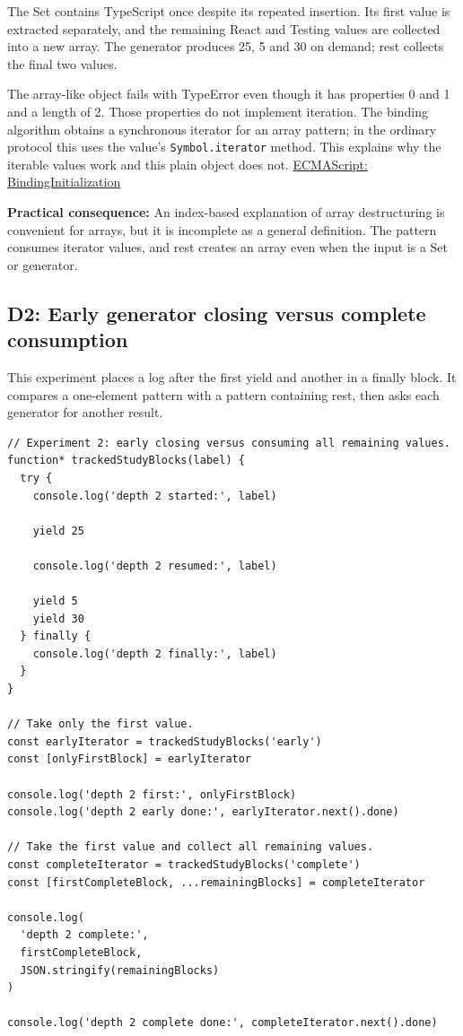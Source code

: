 \documentclass[10pt,a4paper]{article}
\begin{document}
The Set contains TypeScript once despite its repeated insertion. Its first value is extracted separately, and the remaining React and Testing values are collected into a new array. The generator produces 25, 5 and 30 on demand; rest collects the final two values.

The array-like object fails with TypeError even though it has properties 0 and 1 and a length of 2. Those properties do not implement iteration. The binding algorithm obtains a synchronous iterator for an array pattern; in the ordinary protocol this uses the value's \texttt{Symbol.\allowbreak{}iterator} method. This explains why the iterable values work and this plain object does not. \href{https://tc39.es/ecma262/multipage/syntax-directed-operations.html\#sec-runtime-semantics-bindinginitialization}{ECMAScript: BindingInitialization}

\textbf{Practical consequence:} An index-based explanation of array destructuring is convenient for arrays, but it is incomplete as a general definition. The pattern consumes iterator values, and rest creates an array even when the input is a Set or generator.

\subsection{D2: Early generator closing versus complete consumption}

This experiment places a log after the first yield and another in a finally block. It compares a one-element pattern with a pattern containing rest, then asks each generator for another result.

\begin{lstlisting}[language=GuideJS]
// Experiment 2: early closing versus consuming all remaining values.
function* trackedStudyBlocks(label) {
  try {
    console.log('depth 2 started:', label)

    yield 25

    console.log('depth 2 resumed:', label)

    yield 5
    yield 30
  } finally {
    console.log('depth 2 finally:', label)
  }
}

// Take only the first value.
const earlyIterator = trackedStudyBlocks('early')
const [onlyFirstBlock] = earlyIterator

console.log('depth 2 first:', onlyFirstBlock)
console.log('depth 2 early done:', earlyIterator.next().done)

// Take the first value and collect all remaining values.
const completeIterator = trackedStudyBlocks('complete')
const [firstCompleteBlock, ...remainingBlocks] = completeIterator

console.log(
  'depth 2 complete:',
  firstCompleteBlock,
  JSON.stringify(remainingBlocks)
)

console.log('depth 2 complete done:', completeIterator.next().done)
\end{lstlisting}
\end{document}
